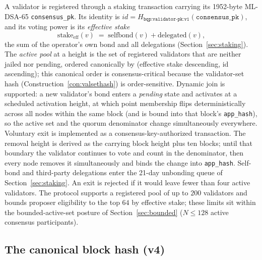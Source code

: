 \documentclass[11pt]{article}
\newcommand{\code}[1]{\texttt{#1}}
\newcommand{\mldsa}{ML\mbox{-}DSA\mbox{-}65}
\theoremstyle{plain}
\theoremstyle{definition}
\theoremstyle{remark}
\begin{document}
A validator is registered through a staking transaction carrying its 1952-byte
\mldsa{} \code{consensus\_pk}. Its identity is
$\mathit{id} = H_{\code{bqp:validator-pk:v1}}(\code{consensus\_pk})$, and its
voting power is its \emph{effective stake}
\[
\mathrm{stake}_{\mathrm{eff}}(v) \;=\; \mathrm{selfbond}(v) + \mathrm{delegated}(v),
\]
the sum of the operator's own bond and all delegations
(Section~\ref{sec:staking}). The \emph{active pool} at a height is the set of
registered validators that are neither jailed nor pending, ordered canonically
by (effective stake descending, id ascending); this canonical order is
consensus-critical because the validator-set hash
(Construction~\ref{con:valsethash}) is order-sensitive. Dynamic join is
supported: a new validator's bond enters a \emph{pending} state and activates
at a scheduled activation height, at which point membership flips
deterministically across all nodes within the same block (and is bound into
that block's \code{app\_hash}), so the active set and the quorum denominator
change simultaneously everywhere. Voluntary exit is implemented as a
consensus-key-authorized transaction. The removal height is derived as the
carrying block height plus ten blocks; until that boundary the validator
continues to vote and count in the denominator, then every node removes it
simultaneously and binds the change into \code{app\_hash}. Self-bond and
third-party delegations enter the 21-day unbonding queue of
Section~\ref{sec:staking}. An exit is rejected if it would leave fewer than
four active validators. The protocol supports a registered pool of up to
$200$ validators and bounds proposer eligibility to the top $64$ by effective
stake; these limits sit within the bounded-active-set posture of
Section~\ref{sec:bounded} ($N \le 128$ active consensus participants).

\subsection{The canonical block hash (v4)}
\label{sec:blockhash}
\end{document}
